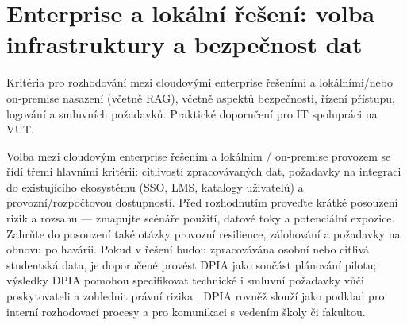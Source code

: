 \documentclass{report}%
\begin{document}
%
\section{Enterprise a lokální řešení: volba infrastruktury a bezpečnost dat}%
Kritéria pro rozhodování mezi cloudovými enterprise řešeními a lokálními/nebo on‑premise nasazení (včetně RAG), včetně aspektů bezpečnosti, řízení přístupu, logování a smluvních požadavků. Praktické doporučení pro IT spolupráci na VUT.%


%
Volba mezi cloudovým enterprise řešením a lokálním / on‑premise provozem se řídí třemi hlavními kritérii: citlivostí zpracovávaných dat, požadavky na integraci do existujícího ekosystému (SSO, LMS, katalogy uživatelů) a provozní/rozpočtovou dostupností. Před rozhodnutím proveďte krátké posouzení rizik a rozsahu — zmapujte scénáře použití, datové toky a potenciální expozice. Zahrňte do posouzení také otázky provozní resilience, zálohování a požadavky na obnovu po havárii. Pokud v řešení budou zpracovávána osobní nebo citlivá studentská data, je doporučené provést DPIA jako součást plánování pilotu; výsledky DPIA pomohou specifikovat technické i smluvní požadavky vůči poskytovateli a zohlednit právní rizika \cite{kb_malinka_chatgpt_ve_vyuce_dva_roky_pote_2024_pdf_90bc3aaf_page_12_1}. DPIA rovněž slouží jako podklad pro interní rozhodovací procesy a pro komunikaci s vedením školy či fakultou.
\end{document}
